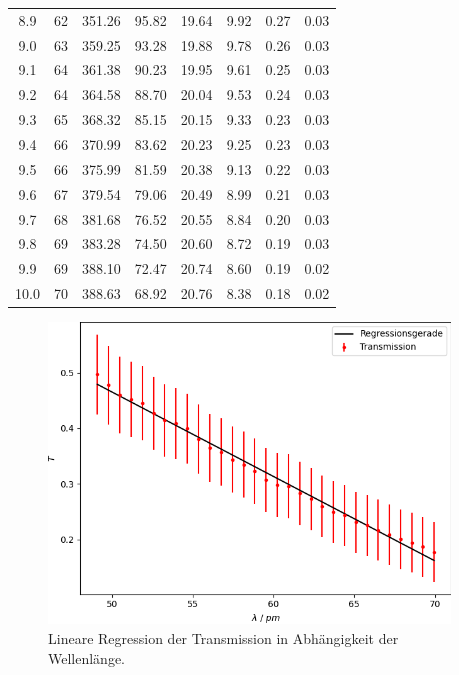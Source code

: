 \begin{table}[H]
\begin{tabular} {c  c| c  c|  c  c|  c|  c}
        8.9  & 62 & 351.26 &  95.82 & 19.64 &  9.92 & 0.27 & 0.03 \\
        9.0  & 63 & 359.25 &  93.28 & 19.88 &  9.78 & 0.26 & 0.03 \\ 
        9.1  & 64 & 361.38 &  90.23 & 19.95 &  9.61 & 0.25 & 0.03 \\ 
        9.2  & 64 & 364.58 &  88.70 & 20.04 &  9.53 & 0.24 & 0.03 \\
        9.3  & 65 & 368.32 &  85.15 & 20.15 &  9.33 & 0.23 & 0.03 \\
        9.4  & 66 & 370.99 &  83.62 & 20.23 &  9.25 & 0.23 & 0.03 \\
        9.5  & 66 & 375.99 &  81.59 & 20.38 &  9.13 & 0.22 & 0.03 \\ 
        9.6  & 67 & 379.54 &  79.06 & 20.49 &  8.99 & 0.21 & 0.03 \\ 
        9.7  & 68 & 381.68 &  76.52 & 20.55 &  8.84 & 0.20 & 0.03 \\ 
        9.8  & 69 & 383.28 &  74.50 & 20.60 &  8.72 & 0.19 & 0.03 \\
        9.9  & 69 & 388.10 &  72.47 & 20.74 &  8.60 & 0.19 & 0.02 \\ 
        10.0 & 70 & 388.63 &  68.92 & 20.76 &  8.38 & 0.18 & 0.02 \\
        \bottomrule
    \end{tabular} 
\end{table}

\begin{figure}[H] 
    \centering
    \includegraphics[height=80mm]{bilder/Transmission.png}
    \caption{Lineare Regression der Transmission in Abhängigkeit der Wellenlänge.\label{Abbildung4} }
\end{figure}


